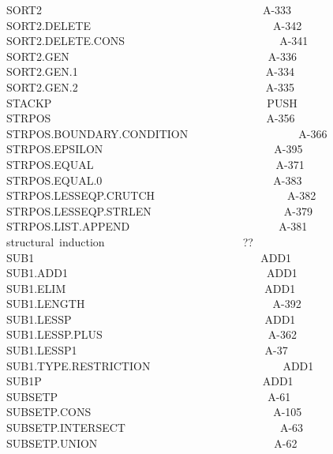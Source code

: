\documentclass[11pt]{book}
\newenvironment{pubasis}{\begin{flushleft}\ttfamily\small}{\normalsize\rmfamily\end{flushleft}}
\begin{document}
\begin{pubasis}
SORT2~~~~~~~~~~~~~~~~~~~~~~~~~~~~~~~~~~~~~~~~A-333\\
SORT2.DELETE~~~~~~~~~~~~~~~~~~~~~~~~~~~~~~~~~A-342\\
SORT2.DELETE.CONS~~~~~~~~~~~~~~~~~~~~~~~~~~~~A-341\\
SORT2.GEN~~~~~~~~~~~~~~~~~~~~~~~~~~~~~~~~~~~~A-336\\
SORT2.GEN.1~~~~~~~~~~~~~~~~~~~~~~~~~~~~~~~~~~A-334\\
SORT2.GEN.2~~~~~~~~~~~~~~~~~~~~~~~~~~~~~~~~~~A-335\\
STACKP~~~~~~~~~~~~~~~~~~~~~~~~~~~~~~~~~~~~~~~PUSH\\
STRPOS~~~~~~~~~~~~~~~~~~~~~~~~~~~~~~~~~~~~~~~A-356\\
STRPOS.BOUNDARY.CONDITION~~~~~~~~~~~~~~~~~~~~A-366\\
STRPOS.EPSILON~~~~~~~~~~~~~~~~~~~~~~~~~~~~~~~A-395\\
STRPOS.EQUAL~~~~~~~~~~~~~~~~~~~~~~~~~~~~~~~~~A-371\\
STRPOS.EQUAL.0~~~~~~~~~~~~~~~~~~~~~~~~~~~~~~~A-383\\
STRPOS.LESSEQP.CRUTCH~~~~~~~~~~~~~~~~~~~~~~~~A-382\\
STRPOS.LESSEQP.STRLEN~~~~~~~~~~~~~~~~~~~~~~~~A-379\\
STRPOS.LIST.APPEND~~~~~~~~~~~~~~~~~~~~~~~~~~~A-381\\
structural~induction~~~~~~~~~~~~~~~~~~~~~~~~~??\\
SUB1~~~~~~~~~~~~~~~~~~~~~~~~~~~~~~~~~~~~~~~~~ADD1\\
SUB1.ADD1~~~~~~~~~~~~~~~~~~~~~~~~~~~~~~~~~~~~ADD1\\
SUB1.ELIM~~~~~~~~~~~~~~~~~~~~~~~~~~~~~~~~~~~~ADD1\\
SUB1.LENGTH~~~~~~~~~~~~~~~~~~~~~~~~~~~~~~~~~~A-392\\
SUB1.LESSP~~~~~~~~~~~~~~~~~~~~~~~~~~~~~~~~~~~ADD1\\
SUB1.LESSP.PLUS~~~~~~~~~~~~~~~~~~~~~~~~~~~~~~A-362\\
SUB1.LESSP1~~~~~~~~~~~~~~~~~~~~~~~~~~~~~~~~~~A-37\\
SUB1.TYPE.RESTRICTION~~~~~~~~~~~~~~~~~~~~~~~~ADD1\\
SUB1P~~~~~~~~~~~~~~~~~~~~~~~~~~~~~~~~~~~~~~~~ADD1\\
SUBSETP~~~~~~~~~~~~~~~~~~~~~~~~~~~~~~~~~~~~~~A-61\\
SUBSETP.CONS~~~~~~~~~~~~~~~~~~~~~~~~~~~~~~~~~A-105\\
SUBSETP.INTERSECT~~~~~~~~~~~~~~~~~~~~~~~~~~~~A-63\\
SUBSETP.UNION~~~~~~~~~~~~~~~~~~~~~~~~~~~~~~~~A-62\\

\end{pubasis}
\end{document}
